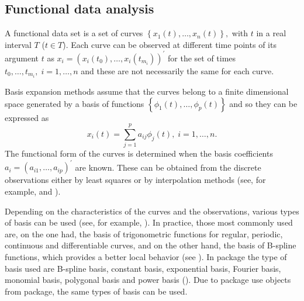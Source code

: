 \subsection{Functional data analysis}

A functional data set is a set of curves $ \left\{ x_1(t),\ldots, x_n (t) \right\}, $ with $t$ in a real interval $T$ ($ t \in T$). Each curve can be observed at different time points of its argument $t$ as $x_{i}=\left( x_{i}\left( t_{0}\right),\ldots ,x_{i}\left(t_{m_{i}}\right) \right)^{\prime}$ for the set of times $t_{0},\ldots,t_{m_{i}},\;i=1,\ldots ,n$ and these are not necessarily the same for each curve.

Basis expansion methods assume that the curves belong to a finite dimensional space generated by a basis of functions $\left\{ \phi _{1}\left( t\right) ,\ldots ,\phi_{p}\left( t\right) \right\} $ and so they can be expressed as 
\begin{equation}
x_{i}\left( t\right) =\sum_{j=1}^{p}a_{ij}\phi _{j}\left( t\right), \;
i=1,\ldots,n.
\label{BasisExpan}
\end{equation}
The functional form of the curves is determined when the basis coefficients $a_i=\left(a_{i1},\ldots,a_{ip}\right)^{\prime}$ are known. These can be obtained from the discrete observations either by least squares or by interpolation methods (see, for example, \citealp{Escabias200595} and \citealp{Escabias2006}).

Depending on the characteristics of the curves and the observations, various types of basis can be used (see, for example, \citealp{Ramsay05}). In practice, those most commonly used are, on the one had, the basis of trigonometric functions for regular, periodic, continuous and differentiable curves, and on the other hand, the basis of B-spline functions, which provides a better local behavior (see \citealp{DeBoor2001}). In  package the type of basis used are B-spline basis, constant basis, exponential basis, Fourier basis, monomial basis, polygonal basis and power basis (\citealp{Ramsay09}). Due to  package use  objects from  package, the same types of basis can be used.


